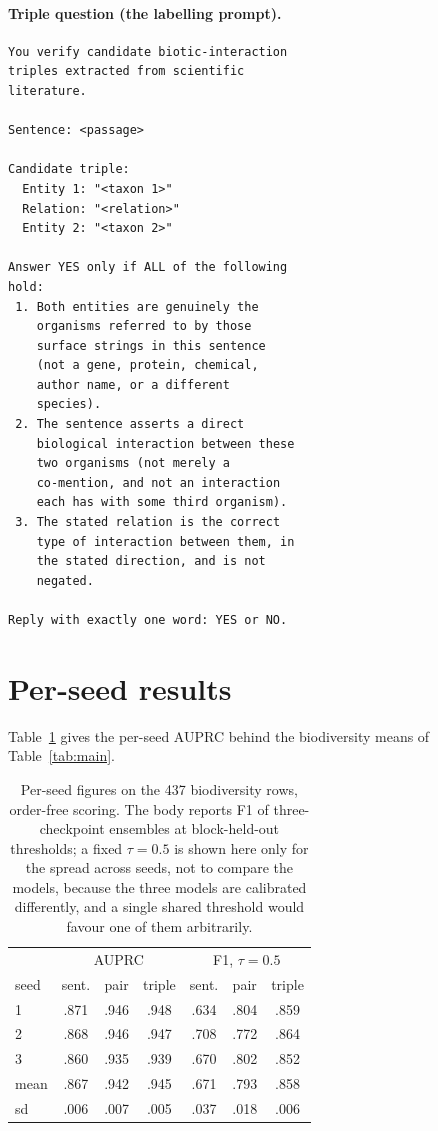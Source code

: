 \documentclass[11pt]{article}
\begin{document}
\paragraph{Triple question (the labelling prompt).}
\begin{footnotesize}
\begin{verbatim}
You verify candidate biotic-interaction
triples extracted from scientific
literature.

Sentence: <passage>

Candidate triple:
  Entity 1: "<taxon 1>"
  Relation: "<relation>"
  Entity 2: "<taxon 2>"

Answer YES only if ALL of the following
hold:
 1. Both entities are genuinely the
    organisms referred to by those
    surface strings in this sentence
    (not a gene, protein, chemical,
    author name, or a different
    species).
 2. The sentence asserts a direct
    biological interaction between these
    two organisms (not merely a
    co-mention, and not an interaction
    each has with some third organism).
 3. The stated relation is the correct
    type of interaction between them, in
    the stated direction, and is not
    negated.

Reply with exactly one word: YES or NO.
\end{verbatim}
\end{footnotesize}

\section{Per-seed results}
\label{app:seeds}

Table~\ref{tab:perseed} gives the per-seed AUPRC behind the biodiversity means of Table~\ref{tab:main}.

\begin{table}[t]\centering\footnotesize
\setlength{\tabcolsep}{2.2pt}
\begin{tabular}{lccc|ccc}
\toprule
 & \multicolumn{3}{c|}{AUPRC} & \multicolumn{3}{c}{F1, $\tau = 0.5$} \\
seed & sent. & pair & triple & sent. & pair & triple \\
\midrule
1 & .871 & .946 & .948 & .634 & .804 & .859 \\
2 & .868 & .946 & .947 & .708 & .772 & .864 \\
3 & .860 & .935 & .939 & .670 & .802 & .852 \\
\midrule
mean & .867 & .942 & .945 & .671 & .793 & .858 \\
sd   & .006 & .007 & .005 & .037 & .018 & .006 \\
\bottomrule
\end{tabular}
\caption{Per-seed figures on the 437 biodiversity rows, order-free scoring. The body reports F1 of
three-checkpoint ensembles at block-held-out thresholds; a fixed $\tau = 0.5$ is shown here only for
the spread across seeds, not to compare the models, because the three models are calibrated
differently, and a single shared threshold would favour one of them arbitrarily.}
\label{tab:perseed}
\end{table}
\end{document}

